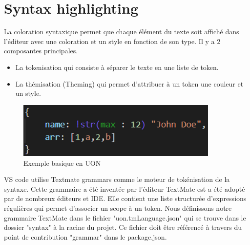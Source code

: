 \documentclass[
    iict, %
    il, %
]{heig-tb}
\begin{document}
\section{Syntax highlighting}



La coloration syntaxique permet que chaque élément du texte soit affiché dans l'éditeur avec une coloration et un style en fonction de son type.
Il y a 2 composantes principales.
\begin{itemize}
    \item La tokenisation qui consiste à séparer le texte en une liste de token.
    \item La thémisation (Theming) qui permet d'attribuer à un token une couleur et un style.
\end{itemize}

\begin{figure}[!h]
    \begin{center}
        \includegraphics[width=10cm]{assets/figures/basic-uon.png}
    \end{center}
    \caption[code UON]{\label{basic-uon} Exemple basique en UON}
\end{figure}


VS code utilise Textmate grammars \cite{textmate-grammars} comme le moteur de tokénisation de la syntaxe.
Cette grammaire a été inventée par l'éditeur TextMate est a été adopté par de nombreux éditeurs et IDE.
Elle contient une liste structurée d'expressions régulières qui permet d'associer un scope à un token.
Nous définissons notre grammaire TextMate dans le fichier "uon.tmLanguage.json" qui  se trouve dans le dossier "syntax" à la racine du projet.
Ce fichier doit être référencé à travers du point de contribution "grammar" dans le package.json.
\end{document}
